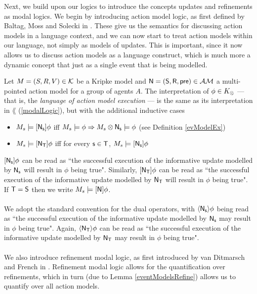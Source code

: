 Next, we build upon our logics to introduce the concepts updates and refinements as modal logics.
We begin by introducing action model logic, as first defined by Baltag, Moss and Solecki in
\cite{baltag1998lpa}.
These give us the semantics for discussing action models in a language context, and we can now start
to treat action models within our language, not simply as models of updates.
This is important, since it now allows us to discuss action models as a language construct, which is
much more a dynamic concept that just as a single event that is being modelled.

\begin{defn} \label{actModelLogic}
Let $M = (S, R, V) \in \mathcal{K}$ be a Kripke model and $\mathrm{\mathsf{\mathrm{\mathsf{N}}
  = (S, R, pre)}} \in
\mathcal{AM}$ a multi-pointed action model for a group of agents $A$.
The interpretation of $\phi \in K_{\otimes}$ --- that is, the {\em language of action model execution} ---  is the same as its interpretation in $\lang$
(\ref{modalLogic}), but with the additional
inductive cases
\begin{itemize}
	\item $M_s \models [{\mathrm{\mathsf{\mathrm{\mathsf{N}}_s}}}] \phi$ iff $M_s \models
  \phi \Rightarrow M_s \otimes \mathrm{\mathsf{\mathrm{\mathsf{N}}_s}} \models
	\phi$ (see Definition \ref{evModelEx})
	\item $M_s \models [{\mathrm{\mathsf{\mathrm{\mathsf{N}}_T}}}] \phi$ iff for every $\mathrm{\mathsf{s
    \in T}}$, $M_s \models [{\mathrm{\mathsf{\mathrm{\mathsf{N}}_s}}}] \phi$ 
\end{itemize}
\end{defn}
$[{\mathrm{\mathsf{\mathrm{\mathsf{N}}_s}}}] \phi$ can be read as ``the successful execution of the informative update modelled by
$\mathrm{\mathsf{\mathrm{\mathsf{N}}_s}}$ will result in $\phi$ being true".
Similarly, $[{\mathrm{\mathsf{\mathrm{\mathsf{N}}_T}}}] \phi$ can be read as ``the successful execution of the informative update
modelled by $\mathrm{\mathsf{\mathrm{\mathsf{N}}_T}}$ will result in $\phi$ being true".
If $\mathrm{\mathsf{T = S}}$ then we write $M_s \models [{\mathrm{\mathsf{\mathrm{\mathsf{N}}}}}] \phi$.\\
\\
We adopt the standard convention for the dual operators, with $\langle {
   \ensuremath {\mathrm{\mathsf{\mathrm{\mathsf{N}}_s}}}  } \rangle \phi$ being
read as ``the successful execution of the informative update modelled by
$\mathrm{\mathsf{\mathrm{\mathsf{N}}_s}}$ may result in
$\phi$ being true".
Again, $\langle {  \ensuremath {\mathrm{\mathsf{\mathrm{\mathsf{N}}_T}}}  } \rangle \phi$ can be read as ``the successful execution of the informative
update modelled by $\mathrm{\mathsf{\mathrm{\mathsf{N}}_T}}$ may result in $\phi$ being true".\\
\\
We also introduce refinement modal logic, as first introduced by van Ditmarsch and French in
\cite{van2009simulation}.
Refinement modal logic allows for the quantification over refinements, which in turn (due to Lemma
\ref{eventModelsRefine}) allows us to quantify over all action models.

